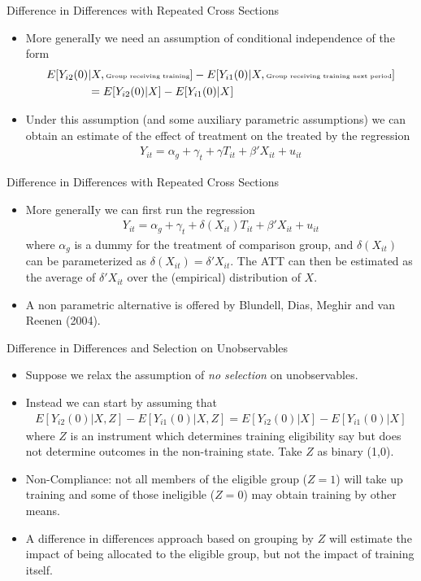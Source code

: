 \documentclass[xcolor=pdftex,dvipsnames,table,mathserif,aspectratio=169]{beamer}
\begin{document}
\begin{frame}{Difference in Differences with Repeated Cross Sections}
\begin{itemize}
\item More generalIy we need an assumption of conditional independence of the form
\begin{align*}
E[Y_{i2}(0) & | X, \text{\tiny Group receiving training}]-E[Y_{i1}(0) | X, \text{\tiny Group receiving training next period}] \\
&= E[Y_{i2}(0) | X] - E[Y_{i1}(0) |X]
\end{align*}
\item Under this assumption (and some auxiliary parametric assumptions) we can obtain an estimate of the effect of treatment on the treated by the regression
\begin{align*}
Y_{it} = \alpha_g + \gamma_t + \gamma T_{it} + \beta' X_{it} + u_{it}
\end{align*} 
\end{itemize}
\end{frame}

\begin{frame}{Difference in Differences with Repeated Cross Sections}
\begin{itemize}
\item More generalIy we can first run the regression 
\begin{align*}
Y_{it} = \alpha_g + \gamma_t + \delta (X_{it}) T_{it} + \beta' X_{it} + u_{it}
\end{align*} 
where $\alpha_g$ is a dummy for the treatment of comparison group, and $\delta (X_{it})$ can be parameterized as $\delta(X_{it}) = \delta' X_{it}$. The ATT can then be estimated as the average of $\delta' X_{it}$ over the (empirical) distribution of $X$.
\item A non parametric alternative is offered by Blundell, Dias, Meghir and van Reenen (2004).
\end{itemize}
\end{frame}

\begin{frame}{Difference in Differences and Selection on Unobservables}
\begin{itemize}
\item Suppose we relax the assumption of \emph{no selection} on unobservables. 
\item Instead we can start by assuming that
\begin{align*}
E[Y_{i2}(0) | X,Z] - E[Y_{i1}(0) | X,Z] = E[Y_{i2}(0) | X] - E[Y_{i1}(0) | X]
\end{align*} 
where $Z$ is an instrument which determines training eligibility say but does not determine outcomes in the non-training state. Take $Z$ as binary (1,0).
\item Non-Compliance: not all members of the eligible group ($Z = 1$) will take up training and some of those ineligible ($Z = 0$) may obtain training by other means.
\item A difference in differences approach based on grouping by $Z$ will estimate the impact of being allocated to the eligible group, but not the impact of training itself.
\end{itemize}
\end{frame}
\end{document}
